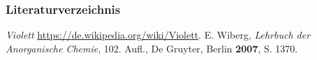 \documentclass{beamer}
\begin{document}
\begin{frame}[t]\frametitle{Literaturverzeichnis}
    

\begin{thebibliography}{9}

\emph{Violett}
 \url{https://de.wikipedia.org/wiki/Violett}.
E. Wiberg, \emph{Lehrbuch der Anorganische Chemie}, 102. Aufl., De Gruyter, Berlin \textbf{2007}, S. 1370.
\end{thebibliography}
  
\end{frame}


\end{document}
